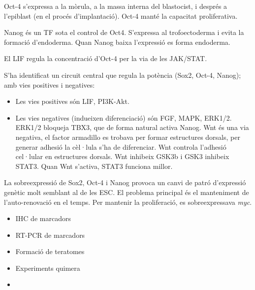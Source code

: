 Oct-4 s'expressa a la mòrula, a la massa interna del blastocist, i després a l'epiblast (en el procés d'implantació). Oct-4 manté la capacitat proliferativa.

Nanog és un TF sota el control de Oct4. S'expressa al trofoectoderma i evita la formació d'endoderma. Quan Nanog baixa l'expressió es forma endoderma.

El LIF regula la concentració d'Oct-4 per la via de les JAK/STAT.


S'ha identificat un circuit central que regula la potència (Sox2, Oct-4, Nanog); amb vies positives i negatives:
\begin{itemize}
\item Les vies positives són LIF, PI3K-Akt. 

\item Les vies negatives (indueixen diferenciació) són FGF, MAPK, ERK1/2. ERK1/2 bloqueja TBX3, que de forma natural activa Nanog. Wnt és una via negativa, el factor armadillo es trobava per formar estructures dorsals, per generar adhesió la cèl·lula s'ha de diferenciar. Wnt controla l'adhesió cel·lular en estructures dorsals. Wnt inhibeix GSK3b i GSK3 inhibeix STAT3. Quan Wnt s'activa, STAT3 funciona millor.
\end{itemize}
 
La sobreexpressió de Sox2, Oct-4 i Nanog provoca un canvi de patró d'expressió genètic molt semblant al de les ESC. El problema principal és el manteniment de l'auto-renovació en el temps. Per mantenir la proliferació, es sobreexpressava \textit{myc}.


\begin{itemize}
\item IHC de marcadors
\item RT-PCR de marcadors
\item Formació de teratomes
\item Experiments quimera
\item 
\end{itemize}